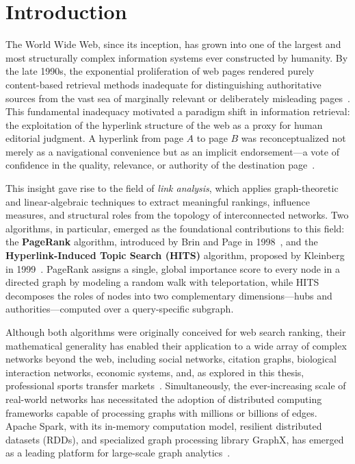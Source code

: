 \chapter{Introduction}
\label{ch:introduction}

The World Wide Web, since its inception, has grown into one of the largest and most structurally complex information systems ever constructed by humanity. By the late 1990s, the exponential proliferation of web pages rendered purely content-based retrieval methods inadequate for distinguishing authoritative sources from the vast sea of marginally relevant or deliberately misleading pages~\cite{brin1998pagerank}. This fundamental inadequacy motivated a paradigm shift in information retrieval: the exploitation of the hyperlink structure of the web as a proxy for human editorial judgment. A hyperlink from page $A$ to page $B$ was reconceptualized not merely as a navigational convenience but as an implicit endorsement---a vote of confidence in the quality, relevance, or authority of the destination page~\cite{stanford1999pagerank}.

This insight gave rise to the field of \textit{link analysis}, which applies graph-theoretic and linear-algebraic techniques to extract meaningful rankings, influence measures, and structural roles from the topology of interconnected networks. Two algorithms, in particular, emerged as the foundational contributions to this field: the \textbf{PageRank} algorithm, introduced by Brin and Page in 1998~\cite{brin1998pagerank}, and the \textbf{Hyperlink-Induced Topic Search (HITS)} algorithm, proposed by Kleinberg in 1999~\cite{kleinberg1999hits}. PageRank assigns a single, global importance score to every node in a directed graph by modeling a random walk with teleportation, while HITS decomposes the roles of nodes into two complementary dimensions---hubs and authorities---computed over a query-specific subgraph.

Although both algorithms were originally conceived for web search ranking, their mathematical generality has enabled their application to a wide array of complex networks beyond the web, including social networks, citation graphs, biological interaction networks, economic systems, and, as explored in this thesis, professional sports transfer markets~\cite{liu2014football, ieice2016football, employee_arxiv}. Simultaneously, the ever-increasing scale of real-world networks has necessitated the adoption of distributed computing frameworks capable of processing graphs with millions or billions of edges. Apache Spark, with its in-memory computation model, resilient distributed datasets (RDDs), and specialized graph processing library GraphX, has emerged as a leading platform for large-scale graph analytics~\cite{spark_graphx}.


